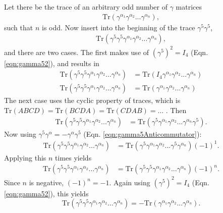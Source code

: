 \label{ssc:gammaOdd=0}

Let there be the trace of an arbitrary odd number of $\gamma$ matrices
\begin{align*}
\text{Tr}(\gamma^{\alpha_1} \gamma^{\alpha_2} ... \gamma^{\alpha_n}),
\end{align*}
such that $n$ is odd. Now insert into the beginning of the trace $\gamma^5
\gamma^5$,
\begin{align*}
\text{Tr}(\gamma^5 \gamma^5 \gamma^{\alpha_1} \gamma^{\alpha_2} ... \gamma^{\alpha_n}),\end{align*}
and there are two cases. The first makes use of $(\gamma^5)^2=I_4$ (Eqn.
\ref{eqn:gamma52}), and
results in
\begin{align}\nonumber
\text{Tr}(\gamma^5 \gamma^5 \gamma^{\alpha_1} \gamma^{\alpha_2} ...
\gamma^{\alpha_n})&=\text{Tr}(I_4
\gamma^{\alpha_1} \gamma^{\alpha_2} ... \gamma^{\alpha_n})\\
\text{Tr}(\gamma^5 \gamma^5 \gamma^{\alpha_1} \gamma^{\alpha_2} ...
\gamma^{\alpha_n})&=\text{Tr}(\gamma^{\alpha_1} \gamma^{\alpha_2} ...
\gamma^{\alpha_n})
\label{eqn:traceOdd1}
\end{align}
The next case uses the cyclic property of traces, which is
$\text{Tr}(ABCD)=\text{Tr}(BCDA)=\text{Tr}(CDAB)=\ldots$ .
Then
\begin{align*}
\text{Tr}(\gamma^5 \gamma^5 \gamma^{\alpha_1} \gamma^{\alpha_2} ...
\gamma^{\alpha_n})&=\text{Tr}(\gamma^5
\gamma^{\alpha_1} \gamma^{\alpha_2} ... \gamma^{\alpha_n}\gamma^5).
\end{align*}
Now using $\gamma^5\gamma^\alpha = -\gamma^\alpha \gamma^5$ (Eqn.
\ref{eqn:gamma5Anticommutator}):
\begin{align*}
\text{Tr}(\gamma^5 \gamma^5 \gamma^{\alpha_1} \gamma^{\alpha_2} ...
\gamma^{\alpha_n})&=\text{Tr}(\gamma^5
\gamma^{\alpha_1} \gamma^{\alpha_2} ... \gamma^5 \gamma^{\alpha_n})(-1)^1.
\end{align*}
Applying this $n$ times yields
\begin{align*}
\text{Tr}(\gamma^5 \gamma^5 \gamma^{\alpha_1} \gamma^{\alpha_2} ...
\gamma^{\alpha_n})&=\text{Tr}(\gamma^5
\gamma^5 \gamma^{\alpha_1} \gamma^{\alpha_2} ... \gamma^{\alpha_n})(-1)^n.
\end{align*}
Since $n$ is negative, $(-1)^n=-1$. Again using $(\gamma^5)^2=I_4$ (Eqn.
\ref{eqn:gamma52}), this
yields
\begin{equation}\label{eqn:traceOdd2}
\text{Tr}(\gamma^5 \gamma^5 \gamma^{\alpha_1} \gamma^{\alpha_2} ...
\gamma^{\alpha_n})=-\text{Tr}(\gamma^{\alpha_1} \gamma^{\alpha_2} ...
\gamma^{\alpha_n}).
\end{equation}
